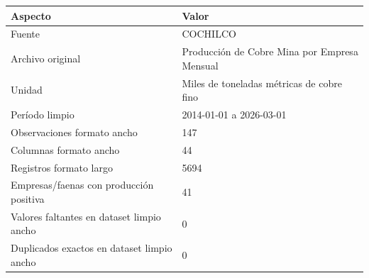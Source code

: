 \begin{tabular}{lp{}}
\toprule
Aspecto & Valor \\
\midrule
Fuente & COCHILCO \\
Archivo original & Producción de Cobre Mina por Empresa Mensual \\
Unidad & Miles de toneladas métricas de cobre fino \\
Período limpio & 2014-01-01 a 2026-03-01 \\
Observaciones formato ancho & 147 \\
Columnas formato ancho & 44 \\
Registros formato largo & 5694 \\
Empresas/faenas con producción positiva & 41 \\
Valores faltantes en dataset limpio ancho & 0 \\
Duplicados exactos en dataset limpio ancho & 0 \\
\bottomrule
\end{tabular}
